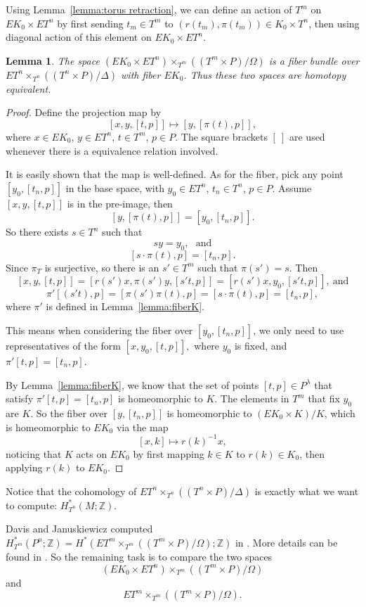 \documentclass[12pt]{amsart}
\def\Z {{\mathbb{Z}}}
\newtheorem{lemma}[theorem]{Lemma}
\theoremstyle{definition}
\numberwithin{equation}{section}
\begin{document}
Using Lemma~\ref{lemma:torus retraction}, we can define an action of
$T^m$ on $EK_{0}\times ET^n$ by first sending $t_{m}\in T^m$ to
$(r(t_{m}), \pi(t_{m}))\in K_{0}\times T^n$, then using diagonal
action of this element on $EK_{0}\times ET^n$.


\begin{lemma}\label{lemma:EK0 bundle}
 The space $(EK_{0}\times ET^n)\times_{T^m}((T^m\times P)/\Omega)$ is a
fiber bundle over\\  $ET^n\times_{T^n}((T^n\times P)/\Delta)$ with
fiber $EK_{0}$. Thus these two spaces are homotopy equivalent.
\end{lemma}
\begin{proof}
Define the projection map by
 \[[x,y,[t,p]]\mapsto
[y,[\pi(t),p]],\] where $x\in EK_{0}$, $y\in ET^n$, $t\in T^m$,
$p\in P$. The square brackets $[\ ]$ are used whenever there is a
equivalence relation involved.

It is easily shown that the map is well-defined. As for the fiber,
pick any point $[y_{0},[t_{n},p]]$ in the base space, with $y_{0}\in
ET^n$, $t_{n}\in T^n$, $p\in P$.
 Assume $[x,y,[t,p]]$
is in the pre-image, then \[[y,[\pi(t),p]]=[y_{0},[t_{n},p]].\]
 So there exists
$s\in T^n$ such that \[sy=y_{0},\ \ \  \mbox{and}\]
\[[s\cdot\pi(t),p]=[t_{n},p].\]
Since $\pi_{T}$ is surjective, so there is an $s'\in T^m$ such that
$\pi(s')=s$.
 Then \[[x,y,[t,p]]=[r(s')x,\pi(s')y,[s't,p]]=[r(s')x,
y_{0}, [s't,p]],\ \mbox{and}\]
 \[ \pi'[(s't),p]=[\pi(s')\pi(t),p]= [s\cdot\pi(t),p]= [t_{n},p],\]
 where $\pi'$ is defined in Lemma~\ref{lemma:fiberK}.

This means when considering the fiber over $[y_{0},[t_{n},p]]$, we
only need to use representatives of the form $[x,y_{0},[t,p]],$
where $y_{0}$ is fixed, and $\pi'[t,p]= [t_{n},p]$.

By Lemma~\ref{lemma:fiberK}, we know that the set of points
$[t,p]\in P^{\lambda}$ that satisfy $\pi'[t,p]=[t_{n},p]$ is
homeomorphic to $K$.
  The elements in
$T^m$ that fix $y_{0}$ are $K$.
 So the fiber over $[y,[t_{n},p]]$
is homeomorphic to $(EK_{0}\times K)/K$, which is homeomorphic to
$EK_{0}$ via the map \[[x,k]\mapsto r(k)^{-1}x,\] noticing that $K$
acts on $EK_{0}$ by first mapping $k\in K$ to $r(k)\in K_{0}$, then
applying $r(k)$ to $EK_{0}$.
\end{proof}


Notice that the cohomology of $ET^n\times_{T^n}((T^n\times
P)/\Delta)$ is exactly what we want to compute: $H_{T^n}^{*}(M;\Z)$.

Davis and Januskiewicz computed
$H_{T^m}^{*}(P^\mu;\Z)=H^{*}(ET^m\times_{T^m}((T^m\times
P)/\Omega);\Z)$ in \cite{DJ}. More details can be found in
\cite[434-436]{DJ}. So the remaining task is to compare the two
spaces\[(EK_{0}\times ET^n)\times_{T^m}((T^m\times P)/\Omega)\]
 and
\[ET^m\times_{T^m}((T^m\times P)/\Omega).\]
\end{document}
